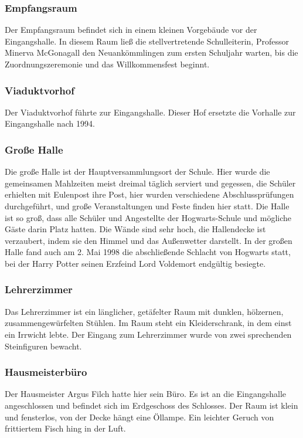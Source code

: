 \documentclass[a4paper, 10pt]{article}
\begin{document}
\subsubsection*{\large Empfangsraum}
Der Empfangsraum befindet sich in einem kleinen Vorgebäude vor der Eingangshalle. In diesem Raum ließ die stellvertretende Schulleiterin, Professor Minerva McGonagall den Neuankömmlingen zum ersten Schuljahr warten, bis die Zuordnungszeremonie und das Willkommensfest beginnt.
\subsubsection*{\large Viaduktvorhof}
Der Viaduktvorhof führte zur Eingangshalle. Dieser Hof ersetzte die Vorhalle zur Eingangshalle nach 1994.
\subsubsection*{\large Große Halle}
Die große Halle ist der Hauptversammlungsort der Schule. Hier wurde die gemeinsamen Mahlzeiten meist dreimal täglich serviert und gegessen, die Schüler erhielten mit Eulenpost ihre Post, hier wurden verschiedene Abschlussprüfungen durchgeführt, und große Veranstaltungen und Feste finden hier statt. Die Halle ist so groß, dass alle Schüler und Angestellte der Hogwarts-Schule und mögliche Gäste darin Platz hatten. Die Wände sind sehr hoch, die Hallendecke ist verzaubert, indem sie den Himmel und das Außenwetter darstellt.
\vspace{10pt}
\newline
{}  
In der großen Halle fand auch am 2. Mai 1998 die abschließende Schlacht von Hogwarts statt, bei der Harry Potter seinen Erzfeind Lord Voldemort endgültig besiegte.
\subsubsection*{\large Lehrerzimmer}
Das Lehrerzimmer ist ein länglicher, getäfelter Raum mit dunklen, hölzernen, zusammengewürfelten Stühlen. Im Raum steht ein Kleiderschrank, in dem einst ein Irrwicht lebte. Der Eingang zum Lehrerzimmer wurde von zwei sprechenden Steinfiguren bewacht.
\subsubsection*{\large Hausmeisterbüro}
Der Hausmeister Argus Filch hatte hier sein Büro. Es ist an die Eingangshalle angeschlossen und befindet sich im Erdgeschoss des Schlosses. Der Raum ist klein und fensterlos, von der Decke hängt eine Öllampe. Ein leichter Geruch von frittiertem Fisch hing in der Luft.
\end{document}

